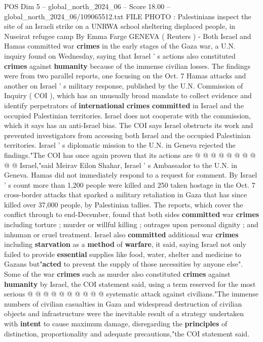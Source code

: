 \begin{textsample}{POS Dim 5 – global\_north\_2024\_06 – Score 18.00 – global\_north\_2024\_06/109065512.txt}  \label{ex:f5_pos_314}
FILE PHOTO : Palestinians inspect the site of an Israeli strike on a UNRWA school sheltering displaced people, in Nuseirat refugee camp By Emma Farge GENEVA ( Reuters ) - Both Israel and Hamas committed war \textbf{crimes} in the early stages of the Gaza war, a U.N. inquiry found on Wednesday, saying that Israel ' s actions also constituted \textbf{crimes} against \textbf{humanity} because of the immense civilian losses.
The findings were from two parallel reports, one focusing on the Oct. 7 Hamas attacks and another on Israel ' s military response, published by the U.N.
Commission of Inquiry ( COI ), which has an unusually broad mandate to collect evidence and identify perpetrators of \textbf{international} \textbf{crimes} \textbf{committed} in Israel and the occupied Palestinian territories.
Israel does not cooperate with the commission, which it says has an anti-Israel bias.
The COI says Israel obstructs its work and prevented investigators from accessing both Israel and the occupied Palestinian territories.
Israel ' s diplomatic mission to the U.N. in Geneva rejected the findings."The COI has once again proven that its actions are @ @ @ @ @ @ @ @ @ @ Israel,"said Meirav Eilon Shahar, Israel ' s Ambassador to the U.N. in Geneva.
Hamas did not immediately respond to a request for comment.
By Israel ' s count more than 1,200 people were killed and 250 taken hostage in the Oct. 7 cross-border attacks that sparked a military retaliation in Gaza that has since killed over 37,000 people, by Palestinian tallies.
The reports, which cover the conflict through to end-December, found that both sides \textbf{committed} war \textbf{crimes} including torture ; murder or willful killing ; outrages upon personal dignity ; and inhuman or cruel treatment.
Israel also \textbf{committed} additional war \textbf{crimes} including \textbf{starvation} as a \textbf{method} of \textbf{warfare}, it said, saying Israel not only failed to provide \textbf{essential} supplies like food, water, shelter and medicine to Gazans but"\textbf{acted} to prevent the supply of those necessities by anyone else".
Some of the war \textbf{crimes} such as murder also constituted \textbf{crimes} against \textbf{humanity} by Israel, the COI statement said, using a term reserved for the most serious @ @ @ @ @ @ @ @ @ @ systematic attack against civilians."The immense numbers of civilian casualties in Gaza and widespread destruction of civilian objects and infrastructure were the inevitable result of a strategy undertaken with \textbf{intent} to cause maximum damage, disregarding the \textbf{principles} of distinction, proportionality and adequate precautions,"the COI statement said.

\end{textsample}
